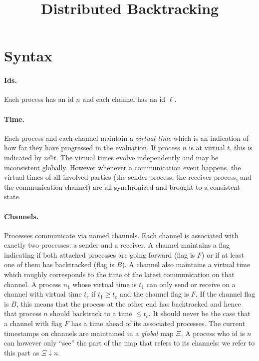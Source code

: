 \documentclass{article}
\title{Distributed Backtracking}
\author{}
\date{}
\begin{document}
\maketitle

\newcommand{\alt}{~|~}
\newcommand{\parc}[2]{#1 \,\|\, #2}
\newcommand{\send}[2]{\texttt{send}~#1~#2}
\newcommand{\stable}[1]{\texttt{stable}~#1}
\newcommand{\stableu}[1]{\underline{\texttt{stable}}~#1}
\newcommand{\backtrack}[1]{\texttt{backtrack}~#1}
\newcommand{\recv}[4]{\texttt{recv}~(#1.#2) \talloblong (#3.#4)}
\newcommand{\proc}[4]{\langle #1@#4:~ #2,#3 \rangle}

\section{Syntax} 

\paragraph*{Ids.} Each process has an id $n$ and each channel has an id
$\ell$.

\paragraph*{Time.} Each process and each channel maintain a \emph{virtual
  time} which is an indication of how far they have progressed in the
evaluation. If process $n$ is at virtual $t$, this is indicated by $n@t$. The
virtual times evolve independently and may be inconsistent globally. However
whenever a communication event happens, the virtual times of all involved
parties (the sender process, the receiver process, and the communication
channel) are all synchronized and brought to a consistent state.

\paragraph*{Channels.} Processes communicate via named channels. Each channel
is associated with exactly two processes: a sender and a receiver. A channel
maintains a flag indicating if both attached processes are going forward
(flag is $F$) or if at least one of them has backtracked (flag is $B$). A
channel also maintains a virtual time which roughly corresponds to the time
of the latest communication on that channel. A process $n_1$ whose virtual
time is $t_1$ can only send or receive on a channel with virtual time $t_c$
if $t_1 \geq t_c$ and the channel flag is $F$. If the channel flag is $B$,
this means that the process at the other end has backtracked and hence that
process $n$ should backtrack to a time $\leq t_c$. It should never be the
case that a channel with flag $F$ has a time ahead of its associated
processes. The current timestamps on channels are maintained in a
\emph{global} map $\Xi$. A process who id is $n$ can however only ``see'' the
part of the map that refers to its channels: we refer to this part as
$\Xi\downarrow n$.
\end{document}
